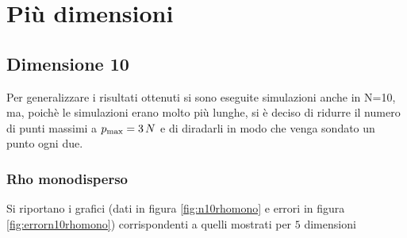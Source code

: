 \documentclass[a4paper,12pt,twoside,openright]{report}
\begin{document}
\section{Più dimensioni}
\label{sec:piùdim}

\subsection{Dimensione 10}
\label{subsec:10dim}

Per generalizzare i risultati ottenuti si sono eseguite simulazioni anche in N=10, ma, poichè le simulazioni erano molto più lunghe, si è deciso di ridurre il numero di punti massimi a $ p_\textup{max} = 3\,N $ e di diradarli in modo che venga sondato un punto ogni due.

\subsubsection{Rho monodisperso}
\label{subsubsec:10dimrhomono}
Si riportano i grafici (dati in figura \ref{fig:n10rhomono} e errori in figura \ref{fig:errorn10rhomono}) corrispondenti a quelli mostrati per $5$ dimensioni
\end{document}
